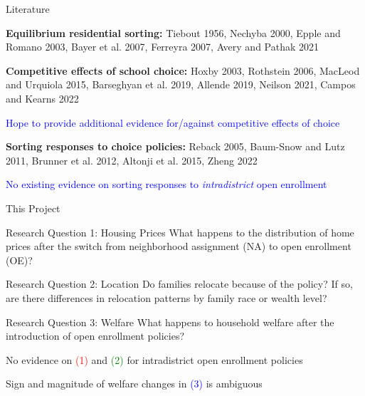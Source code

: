 \documentclass[notes,11pt, aspectratio=169]{beamer}
\newenvironment{wideitemize}{\itemize\addtolength{\itemsep}{10pt}}{\enditemize}
\begin{document}
\begin{frame}{Literature}
\begin{wideitemize}
\item \textbf{Equilibrium residential sorting:} Tiebout 1956, Nechyba 2000, Epple and Romano 2003, Bayer et al. 2007, Ferreyra 2007, Avery and Pathak 2021
\item \textbf{Competitive effects of school choice:} Hoxby 2003, Rothstein 2006, MacLeod and Urquiola 2015, Barseghyan et al. 2019, Allende 2019, Neilson 2021, Campos and Kearns 2022
\begin{wideitemize}
    \item \textcolor{blue}{Hope to provide additional evidence for/against competitive effects of choice}
\end{wideitemize}
\item \textbf{Sorting responses to choice policies:} Reback 2005, Baum-Snow and Lutz 2011, Brunner et al. 2012, Altonji et al. 2015, Zheng 2022
\begin{wideitemize}
    \item \textcolor{blue}{No existing evidence on sorting responses to \textit{intradistrict} open enrollment}
\end{wideitemize}
\end{wideitemize}
\end{frame}

\begin{frame}{This Project}
\begin{alertblock}{Research Question 1: Housing Prices}
  What happens to the distribution of home prices after the switch from neighborhood assignment (NA) to open enrollment (OE)?
\end{alertblock}
\begin{exampleblock}{Research Question 2: Location}
  Do families relocate because of the policy? If so, are there differences in relocation patterns by family race or wealth level?
\end{exampleblock}
\begin{block}{Research Question 3: Welfare}
  What happens to household welfare after the introduction of open enrollment policies?
\end{block}
\medskip 
\begin{wideitemize}
    \item No evidence on \textcolor{red}{(1)} and \textcolor{green}{(2)} for intradistrict open enrollment policies
    \item Sign and magnitude of welfare changes in \textcolor{blue}{(3)} is ambiguous
\end{wideitemize}
\end{frame}
\end{document}
